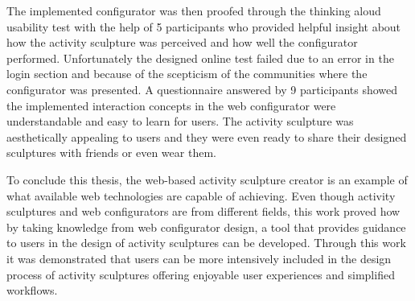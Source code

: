 \documentclass[../medieninformatik-arbeit.tex]{subfiles}
\begin{document}
The implemented configurator was then proofed through the thinking aloud usability test with the help of 5 participants who provided helpful insight about how the activity sculpture was perceived and how well the configurator performed. Unfortunately the designed online test failed due to an error in the login section and because of the scepticism of the communities where the configurator was presented. A questionnaire answered by 9 participants showed the implemented interaction concepts in the web configurator were understandable and easy to learn for users. The activity sculpture was aesthetically appealing to users and they were even ready to share their designed sculptures with friends or even wear them. 

To conclude this thesis, the web-based activity sculpture creator is an example of what available web technologies are capable of achieving. Even though activity sculptures and web configurators are from different fields, this work proved how by taking knowledge from web configurator design, a tool that provides guidance to users in the design of activity sculptures can be developed. Through this work it was demonstrated that users can be more intensively included in the design process of activity sculptures offering enjoyable user experiences and simplified workflows.
\end{document}
